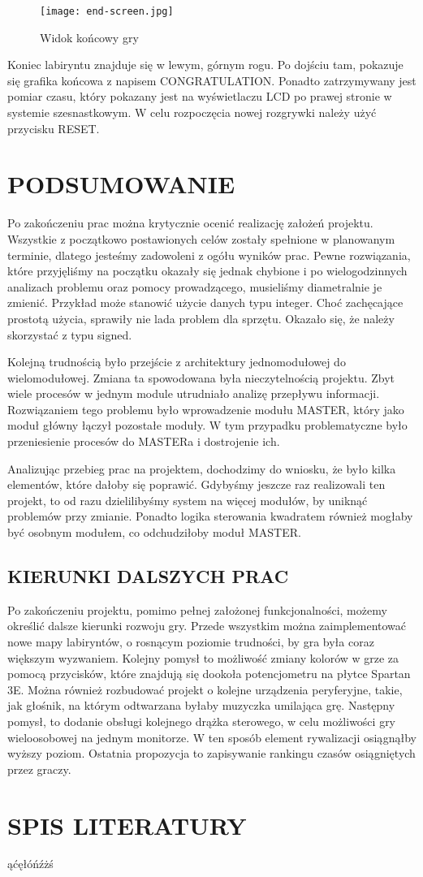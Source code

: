 \documentclass[11pt]{article}
\begin{document}
\begin{figure}[H]
\centering
\texttt{[image: end-screen.jpg]}
\caption{Widok końcowy gry}
\end{figure}

Koniec labiryntu znajduje się w lewym, górnym rogu.
Po dojściu tam, pokazuje się grafika końcowa z napisem CONGRATULATION. %
Ponadto zatrzymywany jest pomiar czasu, który pokazany jest na wyświetlaczu LCD po prawej stronie w systemie szesnastkowym.
W celu rozpoczęcia nowej rozgrywki należy użyć przycisku RESET.





\section{PODSUMOWANIE}

Po zakończeniu prac można krytycznie ocenić realizację założeń projektu.
Wszystkie z początkowo postawionych celów zostały spełnione w planowanym terminie, dlatego jesteśmy zadowoleni z ogółu wyników prac.
Pewne rozwiązania, które przyjęliśmy na początku okazały się jednak chybione i po wielogodzinnych analizach problemu oraz pomocy prowadzącego, musieliśmy diametralnie je zmienić.
Przykład może stanowić użycie danych typu integer.
Choć zachęcające prostotą użycia, sprawiły nie lada problem dla sprzętu.
Okazało się, że należy skorzystać z typu signed.

Kolejną trudnością było przejście z architektury jednomodułowej do wielomodułowej.
Zmiana ta spowodowana była nieczytelnością projektu.
Zbyt wiele procesów w jednym module utrudniało analizę przepływu informacji.
Rozwiązaniem tego problemu było wprowadzenie modułu MASTER, który jako moduł główny łączył pozostałe moduły.
W tym przypadku problematyczne było przeniesienie procesów do MASTERa i dostrojenie ich.

Analizując przebieg prac na projektem, dochodzimy do wniosku, że było kilka elementów, które dałoby się poprawić.
Gdybyśmy jeszcze raz realizowali ten projekt, to od razu dzielilibyśmy system na więcej modułów, by uniknąć problemów przy zmianie.
Ponadto logika sterowania kwadratem również mogłaby być osobnym modułem, co odchudziłoby moduł MASTER.

\subsection{KIERUNKI DALSZYCH PRAC}

Po zakończeniu projektu, pomimo pełnej założonej funkcjonalności, możemy określić dalsze kierunki rozwoju gry.
Przede wszystkim można zaimplementować nowe mapy labiryntów, o rosnącym poziomie trudności, by gra była coraz większym wyzwaniem.
Kolejny pomysł to możliwość zmiany kolorów w grze za pomocą przycisków, które znajdują się dookoła potencjometru na płytce Spartan 3E.
Można również rozbudować projekt o kolejne urządzenia peryferyjne, takie, jak głośnik, na którym odtwarzana byłaby muzyczka umilająca grę.
Następny pomysł, to dodanie obsługi kolejnego drążka sterowego, w celu możliwości gry wieloosobowej na jednym monitorze.
W ten sposób element rywalizacji osiągnąłby wyższy poziom.
Ostatnia propozycja to zapisywanie rankingu czasów osiągniętych przez graczy.


\section{SPIS LITERATURY}

ąćęłóńźżś
\end{document}
